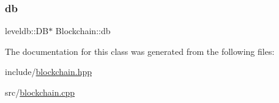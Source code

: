 \subsubsection{\texorpdfstring{db}{db}}
{\footnotesize\ttfamily leveldb\+::\+DB$\ast$ Blockchain\+::db\hspace{0.3cm}{\ttfamily [private]}}



The documentation for this class was generated from the following files\+:\begin{DoxyCompactItemize}
\item 
include/\mbox{\hyperlink{blockchain_8hpp}{blockchain.\+hpp}}\item 
src/\mbox{\hyperlink{blockchain_8cpp}{blockchain.\+cpp}}\end{DoxyCompactItemize}
